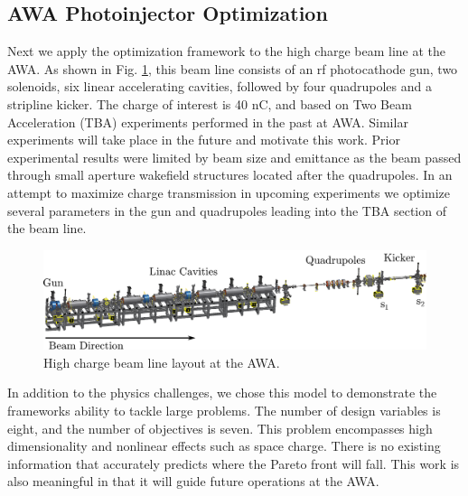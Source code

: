 \subsection{AWA Photoinjector Optimization} \label{awaproblem}
Next we apply the optimization framework to the high charge beam line at the AWA. 
As shown in Fig.  \ref{awa-pic}, this beam line consists of an rf photocathode gun, 
two solenoids, six linear accelerating cavities, 
followed by four quadrupoles and a stripline kicker. 
The charge of interest is 40 nC, and based on Two Beam 
Acceleration (TBA) \cite{gai_power_jing_2012} experiments performed in the past 
at AWA. Similar experiments will take place in the future and motivate this work. 
Prior experimental results were limited by beam size and emittance as the beam passed through small aperture 
wakefield structures located after the quadrupoles. 
In an attempt to maximize charge transmission in upcoming experiments
we optimize several parameters in the gun and quadrupoles leading into the 
TBA section of the beam line.

\begin{figure}
	\centering
	\includegraphics[width=0.9\linewidth]{Report/awa-drawing}
	\caption{High charge beam line layout at the AWA.}
	\label{awa-pic}
\end{figure}

In addition to the physics challenges, we chose this model to demonstrate the frameworks ability to tackle large problems.
The number of design variables is eight, and the number of objectives is seven.
This problem encompasses high dimensionality 
and nonlinear effects such as space charge. There is no existing information
that accurately predicts where the Pareto front will fall. This work is also meaningful in that
it will guide future operations at the AWA.

